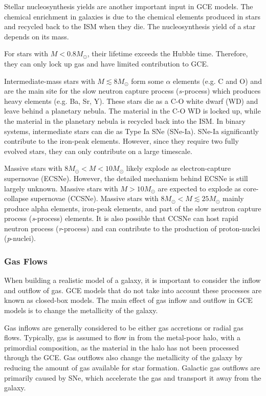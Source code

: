 \documentclass{brandeis-thesis3.2}
\def \msun {M_{\odot}}
\begin{document}
Stellar nucleosynthesis yields are another important input in GCE models. The chemical enrichment in galaxies is due to the chemical elements produced in stars and recycled back to the ISM when they die. The nucleosynthesis yield of a star depends on its mass.

For stars with $M<0.8\msun$, their lifetime exceeds the Hubble time. Therefore, they can only lock up gas and have limited contribution to GCE.

Intermediate-mass stars with $M\lesssim 8 \msun$ form some $\alpha$ elements (e.g. C and O) and are the main site for the slow neutron capture process ($s$-process) which produces heavy elements (e.g. Ba, Sr, Y). These stars die as a C-O white dwarf (WD) and leave behind a planetary nebula. The material in the C-O WD is locked up, while the material in the planetary nebula is recycled back into the ISM. In binary systems, intermediate stars can die as Type Ia SNe (SNe-Ia). SNe-Ia significantly contribute to the iron-peak elements. However, since they require two fully evolved stars, they can only contribute on a large timescale.

Massive stars with $8\msun<M<10\msun$ likely explode as electron-capture supernovae (ECSNe). However, the detailed mechanism behind ECSNe is still largely unknown. Massive stars with $M>10\msun$ are expected to explode as core-collapse supernovae (CCSNe). Massive stars with $8\msun<M\lesssim 25\msun$ mainly produce alpha elements, iron-peak elements, and part of the slow neutron capture process (\textit{s}-process) elements. It is also possible that CCSNe can host rapid neutron process (\textit{r}-process) and can contribute to the production of proton-nuclei (\textit{p}-nuclei).

\subsubsection{Gas Flows}

When building a realistic model of a galaxy, it is important to consider the inflow and outflow of gas. GCE models that do not take into account these processes are known as closed-box models. The main effect of gas inflow and outflow in GCE models is to change the metallicity of the galaxy.

Gas inflows are generally considered to be either gas accretions or radial gas flows. Typically, gas is assumed to flow in from the metal-poor halo, with a primordial composition, as the material in the halo has not been processed through the GCE. Gas outflows also change the metallicity of the galaxy by reducing the amount of gas available for star formation. Galactic gas outflows are primarily caused by SNe, which accelerate the gas and transport it away from the galaxy.
\end{document}
